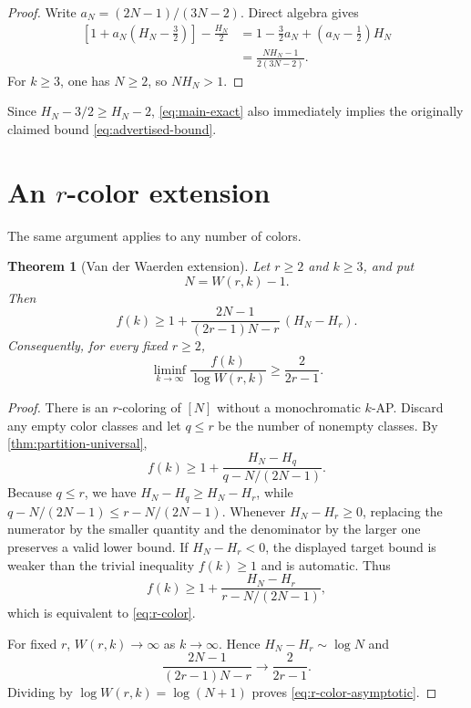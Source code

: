 \documentclass[11pt]{article}
\newtheorem{theorem}{Theorem}[section]
\theoremstyle{definition}
\theoremstyle{remark}
\begin{document}
\begin{proof}
Write $a_N=(2N-1)/(3N-2)$.  Direct algebra gives
\begin{align*}
 \left[1+a_N\left(H_N-\frac32\right)\right]-\frac{H_N}{2}
 &=1-\frac32a_N+\left(a_N-\frac12\right)H_N\\
 &=\frac{NH_N-1}{2(3N-2)}.
\end{align*}
For $k\ge3$, one has $N\ge 2$, so $NH_N>1$.
\end{proof}

Since $H_N-3/2\ge H_N-2$, \cref{eq:main-exact} also immediately implies
the originally claimed bound \cref{eq:advertised-bound}.

\section{An \texorpdfstring{$r$}{r}-color extension}

The same argument applies to any number of colors.

\begin{theorem}[Van der Waerden extension]\label{thm:r-color}
Let $r\ge2$ and $k\ge3$, and put
\[
 N=W(r,k)-1.
\]
Then
\begin{equation}\label{eq:r-color}
 f(k)\ge
 1+\frac{2N-1}{(2r-1)N-r}\,(H_N-H_r).
\end{equation}
Consequently, for every fixed $r\ge2$,
\begin{equation}\label{eq:r-color-asymptotic}
 \liminf_{k\to\infty}
 \frac{f(k)}{\log W(r,k)}
 \ge
 \frac{2}{2r-1}.
\end{equation}
\end{theorem}

\begin{proof}
There is an $r$-coloring of $[N]$ without a monochromatic $k$-AP.  Discard
any empty color classes and let $q\le r$ be the number of nonempty classes.
By \cref{thm:partition-universal},
\[
 f(k)\ge
 1+\frac{H_N-H_q}{q-N/(2N-1)}.
\]
Because $q\le r$, we have $H_N-H_q\ge H_N-H_r$, while
$q-N/(2N-1)\le r-N/(2N-1)$.  Whenever $H_N-H_r\ge0$, replacing the
numerator by the smaller quantity and the denominator by the larger one
preserves a valid lower bound.  If $H_N-H_r<0$, the displayed target bound
is weaker than the trivial inequality $f(k)\ge1$ and is automatic.  Thus
\[
 f(k)\ge
 1+\frac{H_N-H_r}{r-N/(2N-1)},
\]
which is equivalent to \cref{eq:r-color}.

For fixed $r$, $W(r,k)\to\infty$ as $k\to\infty$.  Hence
$H_N-H_r\sim\log N$ and
\[
 \frac{2N-1}{(2r-1)N-r}\longrightarrow\frac{2}{2r-1}.
\]
Dividing by $\log W(r,k)=\log(N+1)$ proves
\cref{eq:r-color-asymptotic}.
\end{proof}
\end{document}

